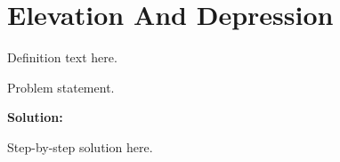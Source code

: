\section{Elevation And Depression}


\begin{definition}[Term]
Definition text here.
\end{definition}

\begin{example}
Problem statement.

\textbf{Solution:}

Step-by-step solution here.
\end{example}
